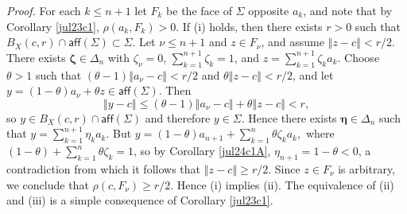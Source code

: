\documentclass[11pt]{article}%
\newenvironment{proof}[1][Proof]{\noindent\textit{#1.} }{}
\begin{document}
\begin{proof}
For each $k\leq n+1$ let $F_{k}$ be the face of $\Sigma$ opposite $a_{k}$, and
note that by Corollary \ref{jul23c1}, $\rho(a_{k},F_{k})>0$. If (i) holds,
then there exists $r>0$ such that $B_{X}(c,r)\cap\mathsf{aff}(\Sigma
)\subset\Sigma$. Let $\nu\leq n+1$ and $z\in F_{\nu}$, and assume $\left\Vert
z-c\right\Vert <r/2$. There exists $\mathbf{\zeta}\in\Delta_{n} $ with
$\zeta_{\nu}=0$, $\sum_{k=1}^{n+1}\zeta_{k}=1$, and $z=\sum_{k=1}^{n+1}%
\zeta_{k}a_{k}$. Choose $\theta>1$ such that $\left(  \theta-1\right)
\left\Vert a_{\nu}-c\right\Vert <r/2$ and $\theta\left\Vert z-c\right\Vert
<r/2$, and let $y=\left(  1-\theta\right)  a_{\nu}+\theta z\in\mathsf{aff}%
(\Sigma)$. Then%
\[
\left\Vert y-c\right\Vert \leq\left(  \theta-1\right)  \left\Vert a_{\nu
}-c\right\Vert +\theta\left\Vert z-c\right\Vert <r,
\]
so $y\in B_{X}(c,r)\cap\mathsf{aff}(\Sigma)$ and therefore $y\in\Sigma$. Hence
there exists $\mathbf{\eta}\in\Delta_{n}$ such that $y=\sum_{k=1}^{n+1}%
\eta_{k}a_{k}$. But $y=\left(  1-\theta\right)  a_{n+1}+\sum_{k=1}^{n}%
\theta\zeta_{k}a_{k}$,\ where $\left(  1-\theta\right)  +\sum_{k=1}^{n}%
\theta\zeta_{k}=1$, so by Corollary \ref{jul24c1A}, $\eta_{n+1}=1-\theta<0$, a
contradiction from which it follows that $\left\Vert z-c\right\Vert \geq r/2$.
Since $z\in F_{\nu}$ is arbitrary, we conclude that $\rho(c,F_{\nu})\geq r/2$.
Hence (i) implies (ii). \label{000022}The equivalence of (ii) and (iii) is a
simple consequence of Corollary \ref{jul23c1}.


\end{proof}
\end{document}
